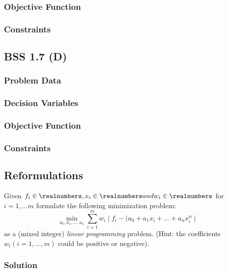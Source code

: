 \documentclass[12pt]{article}
\begin{document}
\subsubsection{Objective Function}

\subsubsection{Constraints}

\subsection{BSS 1.7 (D)}
\subsubsection{Problem Data}

\subsubsection{Decision Variables}

\subsubsection{Objective Function}

\subsubsection{Constraints}


\subsection{Reformulations}
Given  \( f_i \in \realnumbers, x_i \in \realnumbers and w_i \in \realnumbers \) for \( i = 1,...m \) formulate the following minimization problem:\\
\begin{equation*}
    \min_{a_0,a_1,...,a_n} \sum_{i=1}^{m} w_i \mid f_i -  (a_0 + a_1 x_i + ... + a_nx_i^n \mid
\end{equation*}
as a (mixed integer) \textit{linear programming} problem. (Hint: the coefficients \( w_i (i = 1,...,m) \) could be positive or negative).

\subsubsection{Solution}
\end{document}
